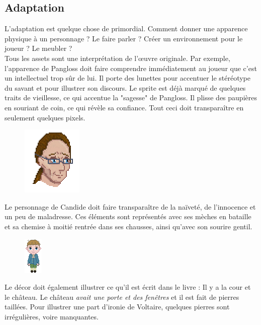 \documentclass[11pt]{article}
\begin{document}
\subsection{Adaptation}
L'adaptation est quelque chose de primordial. Comment donner une apparence physique à un personnage ? Le faire parler ? Créer un environnement pour le joueur ? Le meubler ?\\ 
Tous les assets sont une interprétation de l'œuvre originale. Par exemple, l'apparence de Pangloss doit faire comprendre immédiatement au joueur que c'est un intellectuel trop sûr de lui. Il porte des lunettes pour accentuer le stéréotype du savant et pour illustrer son discours. Le sprite est déjà marqué de quelques traits de vieillesse, ce qui accentue la "sagesse" de Pangloss. Il plisse des paupières en souriant de coin, ce qui révèle sa confiance. Tout ceci doit transparaître en seulement quelques pixels.
\begin{figure}[H]
\includegraphics[scale=0.8]{panglossHead}
\centering
\end{figure}
Le personnage de Candide doit faire transparaître de la naïveté, de l'innocence et un peu de maladresse. Ces éléments sont représentés avec ses mèches en bataille et sa chemise à moitié rentrée dans ses chausses, ainsi qu'avec son sourire gentil.\\
\begin{figure}[H]
\includegraphics[scale=1.3]{candide}
\centering
\end{figure}
Le décor doit également illustrer ce qu'il est écrit dans le livre : Il y a la cour et le château. Le château \textit{avait une porte et des fenêtres} et il est fait de pierres taillées. Pour illustrer une part d'ironie de Voltaire, quelques pierres sont irrégulières, voire manquantes.
\end{document}
